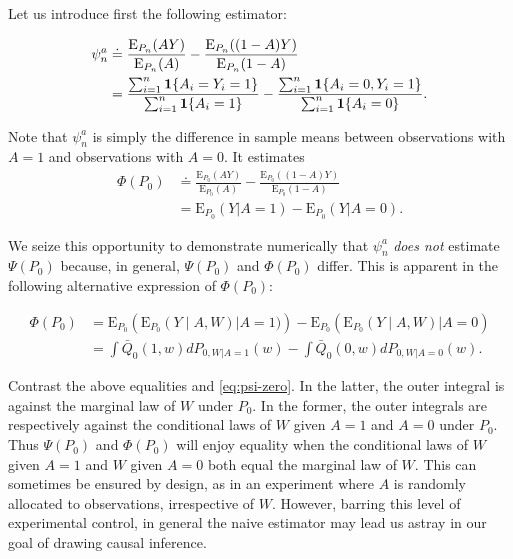 \documentclass[
  11pt,
  openright,twoside]{book}
\newcommand{\defq}{\doteq}
\newcommand{\Exp}{\textrm{E}}
\newcommand{\one}{\textbf{1}}
\newcommand{\Qbar}{\bar{Q}}
\theoremstyle{definition}
\theoremstyle{definition}
\theoremstyle{definition}
\theoremstyle{definition}
\theoremstyle{remark}
\begin{document}
Let us introduce first the following estimator:

\begin{align}
\notag \psi_{n}^{a}
&\defq \frac{\Exp_{P_{n}} (AY)}{\Exp_{P_{n}} (A)} - \frac{\Exp_{P_{n}}
((1-A)Y)}{\Exp_{P_{n}}(1-A)} \\ 
&=          \frac{\sum_{i=1}^{n}         \one\{A_{i}=Y_{i}=1\}}{\sum_{i=1}^{n}
\one\{A_{i}=1\}}                     -                    \frac{\sum_{i=1}^{n}
\one\{A_{i}=0,Y_{i}=1\}}{\sum_{i=1}^{n}\one\{A_{i}=0\}}. \label{eq:cautionary} 
\end{align}

Note that \(\psi_n^a\) is simply the difference in sample means between
observations with \(A = 1\) and observations with \(A = 0\). It estimates
\begin{align*}\Phi(P_{0}) &\defq \frac{\Exp_{P_{0}}
(AY)}{\Exp_{P_{0}} (A)} - \frac{\Exp_{P_{0}} ((1-A)Y)}{\Exp_{P_{0}} (1-A)}\\&=
\Exp_{P_{0}} (Y | A=1) - \Exp_{P_{0}} (Y | A=0).\end{align*}

We seize this opportunity to demonstrate numerically that
\(\psi_{n}^{a}\) \emph{does not} estimate \(\Psi(P_{0})\) because, in general,
\(\Psi(P_{0})\) and \(\Phi(P_{0})\) differ. This is apparent in the following
alternative expression of \(\Phi(P_{0})\):

\begin{align*} \Phi(P_{0}) &= \Exp_{P_{0}} \left(\Exp_{P_0}(Y \mid A, W) |A=1)
\right) -  \Exp_{P_{0}} \left(\Exp_{P_0}(Y \mid  A, W) | A=0\right)\\  &= \int
\Qbar_{0}(1, w) dP_{0,W|A=1}(w) - \int \Qbar_{0}(0, w) dP_{0,W|A=0}(w).
\end{align*}

Contrast the above equalities and \eqref{eq:psi-zero}. In the latter, the
outer integral is against the marginal law of \(W\) under \(P_{0}\). In the
former, the outer integrals are respectively against the conditional laws of
\(W\) given \(A=1\) and \(A=0\) under \(P_{0}\). Thus \(\Psi(P_0)\) and \(\Phi(P_0)\) will
enjoy equality when the conditional laws of \(W\) given \(A = 1\) and \(W\) given
\(A = 0\) both equal the marginal law of \(W\). This can sometimes be
ensured by design, as in an experiment where \(A\) is randomly allocated to
observations, irrespective of \(W\). However, barring this level of experimental
control, in general the naive estimator may lead us astray in our goal of
drawing causal inference.
\end{document}

